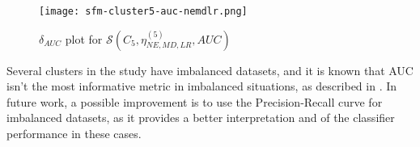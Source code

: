 \begin{figure}[H]
    \centering
    \texttt{[image: sfm-cluster5-auc-nemdlr.png]}
    \caption{$\delta_{AUC}$ plot for $\mathcal{S}(C_5, \eta^{(5)}_{NE, MD, LR}, AUC)$}
    \label{fig:sfm-cluster5-auc-nemdlr}
\end{figure}


Several clusters in the study have imbalanced datasets, and it is known that AUC isn't the most informative metric in imbalanced situations, as described in \cite{saito2015precision}. In future work, a possible improvement is to use the Precision-Recall curve for imbalanced datasets, as it provides a better interpretation and of the classifier performance in these cases.
